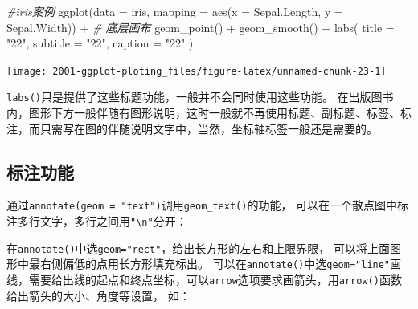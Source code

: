 \documentclass[
]{book}
\newenvironment{Shaded}{\begin{snugshade}}{\end{snugshade}}
\newcommand{\AttributeTok}[1]{\textcolor[rgb]{0.77,0.63,0.00}{#1}}
\newcommand{\CommentTok}[1]{\textcolor[rgb]{0.56,0.35,0.01}{\textit{#1}}}
\newcommand{\FunctionTok}[1]{\textcolor[rgb]{0.00,0.00,0.00}{#1}}
\newcommand{\NormalTok}[1]{#1}
\newcommand{\SpecialCharTok}[1]{\textcolor[rgb]{0.00,0.00,0.00}{#1}}
\newcommand{\StringTok}[1]{\textcolor[rgb]{0.31,0.60,0.02}{#1}}
\begin{document}
\begin{Shaded}
\begin{Highlighting}[]
\CommentTok{\#iris案例}
\FunctionTok{ggplot}\NormalTok{(}\AttributeTok{data =}\NormalTok{ iris, }\AttributeTok{mapping =} \FunctionTok{aes}\NormalTok{(}\AttributeTok{x =}\NormalTok{ Sepal.Length, }\AttributeTok{y =}\NormalTok{ Sepal.Width)) }\SpecialCharTok{+}  \CommentTok{\# 底层画布}
  \FunctionTok{geom\_point}\NormalTok{() }\SpecialCharTok{+}
  \FunctionTok{geom\_smooth}\NormalTok{() }\SpecialCharTok{+}
  \FunctionTok{labs}\NormalTok{(}
    \AttributeTok{title =} \StringTok{"22"}\NormalTok{,}
    \AttributeTok{subtitle =} \StringTok{"22"}\NormalTok{,}
    \AttributeTok{caption =} \StringTok{"22"}
\NormalTok{  )}
\end{Highlighting}
\end{Shaded}

\begin{center}\texttt{[image: 2001-ggplot-ploting\_files/figure-latex/unnamed-chunk-23-1]} \end{center}

\texttt{labs()}只是提供了这些标题功能，一般并不会同时使用这些功能。
在出版图书内，图形下方一般伴随有图形说明，这时一般就不再使用标题、副标题、标签、标注，而只需写在图的伴随说明文字中，当然，坐标轴标签一般还是需要的。

\hypertarget{ux6807ux6ce8ux529fux80fd}{%
\subsection{标注功能}\label{ux6807ux6ce8ux529fux80fd}}

通过\texttt{annotate(geom\ =\ "text")}调用\texttt{geom\_text()}的功能，
可以在一个散点图中标注多行文字，多行之间用\texttt{"\textbackslash{}n"}分开：

在\texttt{annotate()}中选\texttt{geom="rect"}，给出长方形的左右和上限界限，
可以将上面图形中最右侧偏低的点用长方形填充标出。
可以在\texttt{annotate()}中选\texttt{geom="line"}画线，需要给出线的起点和终点坐标，可以\texttt{arrow}选项要求画箭头，用\texttt{arrow()}函数给出箭头的大小、角度等设置，
如：
\end{document}
